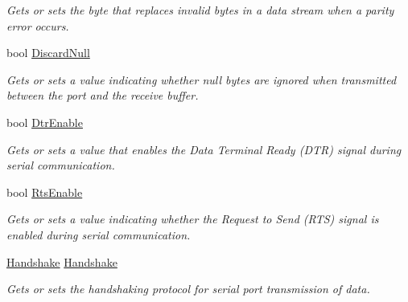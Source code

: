 \begin{DoxyCompactItemize}
\begin{DoxyCompactList}\small\item\em Gets or sets the byte that replaces invalid bytes in a data stream when a parity error occurs. \end{DoxyCompactList}\item 
bool \mbox{\hyperlink{class_r_j_c_p_1_1_i_o_1_1_ports_1_1_serial_port_stream_aa77dd171f67147b88fb42f9ed95a591a}{Discard\+Null}}
\begin{DoxyCompactList}\small\item\em Gets or sets a value indicating whether null bytes are ignored when transmitted between the port and the receive buffer. \end{DoxyCompactList}\item 
bool \mbox{\hyperlink{class_r_j_c_p_1_1_i_o_1_1_ports_1_1_serial_port_stream_ae033eb3641b73520ed03aeae0f64abb0}{Dtr\+Enable}}
\begin{DoxyCompactList}\small\item\em Gets or sets a value that enables the Data Terminal Ready (D\+TR) signal during serial communication. \end{DoxyCompactList}\item 
bool \mbox{\hyperlink{class_r_j_c_p_1_1_i_o_1_1_ports_1_1_serial_port_stream_a225eea5f304fc3a2032cdc7dce436852}{Rts\+Enable}}
\begin{DoxyCompactList}\small\item\em Gets or sets a value indicating whether the Request to Send (R\+TS) signal is enabled during serial communication. \end{DoxyCompactList}\item 
\mbox{\hyperlink{namespace_r_j_c_p_1_1_i_o_1_1_ports_a5328e888558ed5726b3fb7b8b692527c}{Handshake}} \mbox{\hyperlink{class_r_j_c_p_1_1_i_o_1_1_ports_1_1_serial_port_stream_a2f0a0ce1eabd620e65a396a0a84d08da}{Handshake}}
\begin{DoxyCompactList}\small\item\em Gets or sets the handshaking protocol for serial port transmission of data. \end{DoxyCompactList}\item 

\end{DoxyCompactItemize}
